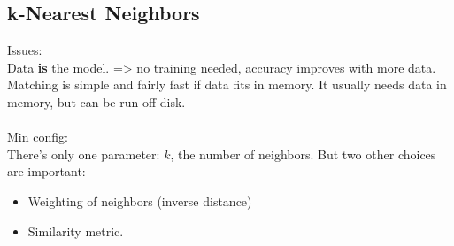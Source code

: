 \subsection{k-Nearest Neighbors}
Issues: \\
Data \textbf{is} the model. => no training needed, accuracy improves with more data. Matching is simple and fairly fast if data fits in memory. It usually needs data in memory, but can be run off disk. 
\\\\
Min config: \\
There's only one parameter: $k$, the number of neighbors. But two other choices are important:
\begin{itemize}
 \item Weighting of neighbors (inverse distance)
 \item Similarity metric.
\end{itemize}

